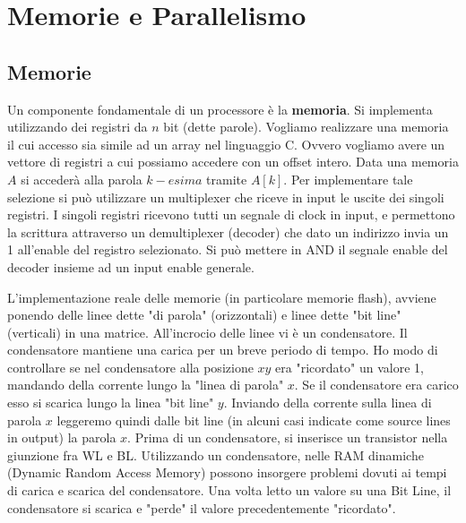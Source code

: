 \chapter{Memorie e Parallelismo}

\section{Memorie}
Un componente fondamentale di un processore è la \textbf{memoria}. Si implementa
utilizzando dei registri da $ n $ bit (dette parole). Vogliamo realizzare una
memoria il cui accesso sia simile ad un array nel linguaggio C. Ovvero vogliamo
avere un vettore di registri a cui possiamo accedere con un offset intero. Data
una memoria $ A $ si accederà alla parola $ k-esima $ tramite $ A[k] $. Per
implementare tale selezione si può utilizzare un multiplexer che riceve in input
le uscite dei singoli registri. I singoli registri ricevono tutti un segnale di
clock in input, e permettono la scrittura attraverso un demultiplexer (decoder)
che dato un indirizzo invia un 1 all'enable del registro selezionato. Si può
mettere in AND il segnale enable del decoder insieme ad un input enable
generale.

L'implementazione reale delle memorie (in particolare memorie flash), avviene
ponendo delle linee dette "di parola" (orizzontali) e linee dette "bit line"
(verticali) in una matrice. All'incrocio delle linee vi è un condensatore. Il
condensatore mantiene una carica per un breve periodo di tempo. Ho modo di
controllare se nel condensatore alla posizione $ xy $ era "ricordato" un valore
1, mandando della corrente lungo la "linea di parola" $ x $. Se il condensatore
era carico esso si scarica lungo la linea "bit line" $ y $. Inviando della
corrente sulla linea di parola $ x $ leggeremo quindi dalle bit line (in alcuni
casi indicate come source lines in output) la parola $ x $. Prima di un
condensatore, si inserisce un transistor nella giunzione fra WL e BL.
Utilizzando un condensatore, nelle RAM dinamiche (Dynamic Random Access Memory)
possono insorgere problemi dovuti ai tempi di carica e scarica del condensatore.
Una volta letto un valore su una Bit Line, il condensatore si scarica e "perde"
il valore precedentemente "ricordato".



